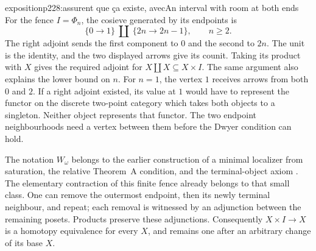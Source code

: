 \begin{dcomment}{exposition}{p228:assurent que ça existe, avec}{An interval with room at both ends}
For the fence $I=\Phi_n$, the cosieve generated by its endpoints is
\[
 \{0\longrightarrow1\}\ \amalg\
 \{2n\longrightarrow2n-1\},\qquad n\geq2.
\]
The right adjoint sends the first component to $0$ and the second to $2n$. The unit is the identity, and the two displayed arrows give its counit. Taking its product with $X$ gives the required adjoint for $X\amalg X\subseteq X\times I$. The same argument also explains the lower bound on $n$. For $n=1$, the vertex $1$ receives arrows from both $0$ and $2$. If a right adjoint existed, its value at $1$ would have to represent the functor on the discrete two-point category which takes both objects to a singleton. Neither object represents that functor. The two endpoint neighbourhoods need a vertex between them before the Dwyer condition can hold.

The notation $W_\omega$ belongs to the earlier construction of a minimal localizer from saturation, the relative Theorem~A condition, and the terminal-object axiom \citep[manuscript p.~14]{Grothendieck1990XIIa}. The elementary contraction of this finite fence already belongs to that small class. One can remove the outermost endpoint, then its newly terminal neighbour, and repeat; each removal is witnessed by an adjunction between the remaining posets. Products preserve these adjunctions. Consequently $X\times I\to X$ is a homotopy equivalence for every $X$, and remains one after an arbitrary change of its base $X$.
\end{dcomment}

